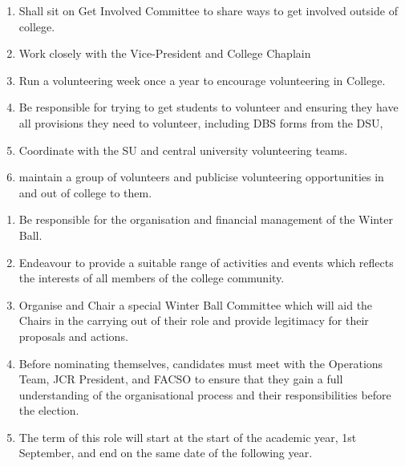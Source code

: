 \begin{enumerate}
    \item Shall sit on Get Involved Committee to share ways to get involved outside of college. 
    \item Work closely with the Vice-President and College Chaplain 
    \item Run a volunteering week once a year to encourage volunteering in College. 
    \item Be responsible for trying to get students to volunteer and ensuring they have all provisions they need to volunteer, including DBS forms from the DSU,
    \item Coordinate with the SU and central university volunteering teams. 
    \item maintain a group of volunteers and publicise volunteering opportunities in and out of college to them. 
\end{enumerate}

\begin{enumerate}
    \item Be responsible for the organisation and financial management of the Winter Ball.
    \item Endeavour to provide a suitable range of activities and events which reflects the interests of all members of the college community.
    \item Organise and Chair a special Winter Ball Committee which will aid the Chairs in the carrying out of their role and provide legitimacy for their proposals and actions.
    \item Before nominating themselves, candidates must meet with the Operations Team, JCR President, and FACSO to ensure that they gain a full understanding of the organisational process and their responsibilities before the election.
    \item The term of this role will start at the start of the academic year, 1st September, and end on the same date of the following year.

    
\end{enumerate}

